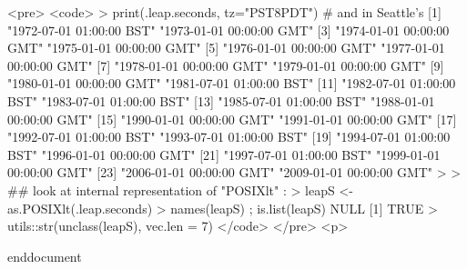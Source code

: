 <pre>
<code>
> print(.leap.seconds, tz="PST8PDT")  # and in Seattle's
 [1] "1972-07-01 01:00:00 BST" "1973-01-01 00:00:00 GMT"
 [3] "1974-01-01 00:00:00 GMT" "1975-01-01 00:00:00 GMT"
 [5] "1976-01-01 00:00:00 GMT" "1977-01-01 00:00:00 GMT"
 [7] "1978-01-01 00:00:00 GMT" "1979-01-01 00:00:00 GMT"
 [9] "1980-01-01 00:00:00 GMT" "1981-07-01 01:00:00 BST"
[11] "1982-07-01 01:00:00 BST" "1983-07-01 01:00:00 BST"
[13] "1985-07-01 01:00:00 BST" "1988-01-01 00:00:00 GMT"
[15] "1990-01-01 00:00:00 GMT" "1991-01-01 00:00:00 GMT"
[17] "1992-07-01 01:00:00 BST" "1993-07-01 01:00:00 BST"
[19] "1994-07-01 01:00:00 BST" "1996-01-01 00:00:00 GMT"
[21] "1997-07-01 01:00:00 BST" "1999-01-01 00:00:00 GMT"
[23] "2006-01-01 00:00:00 GMT" "2009-01-01 00:00:00 GMT"
> 
> ## look at      internal      representation of "POSIXlt" :
> leapS <- as.POSIXlt(.leap.seconds)
> names(leapS) ; is.list(leapS)
NULL
[1] TRUE
> utils::str(unclass(leapS), vec.len = 7)
</code>
</pre>
<p>


end{document}
